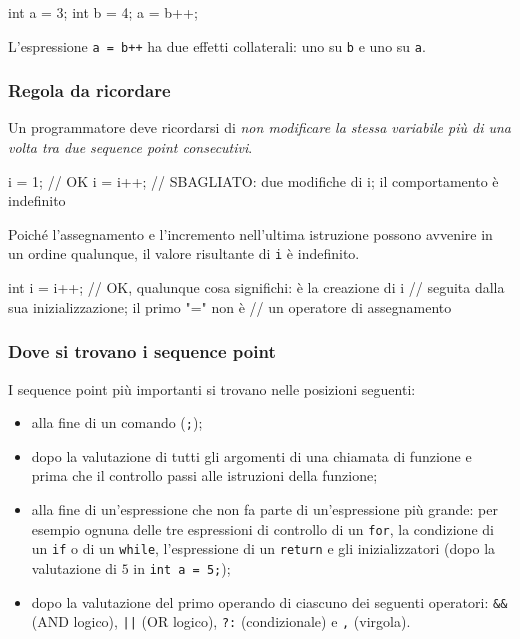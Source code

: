 \documentclass[11pt,a4paper]{article}
\begin{document}
\begin{esempio}
\begin{codice}
int a = 3;
int b = 4;
a = b++;
\end{codice}
L'espressione \lstinline|a = b++| ha due effetti collaterali: uno su \lstinline|b| e uno su \lstinline|a|.
\end{esempio}

\subsubsection{Regola da ricordare}

Un programmatore deve ricordarsi di \emph{non modificare la stessa variabile più di una volta tra due sequence point consecutivi}.

\begin{codice}
i = 1;       // OK
i = i++;     // SBAGLIATO: due modifiche di i; il comportamento è indefinito
\end{codice}
Poiché l'assegnamento e l'incremento nell'ultima istruzione possono avvenire in un ordine qualunque, il valore risultante di \lstinline|i| è indefinito.
\begin{codice}
int i = i++;   // OK, qualunque cosa significhi: è la creazione di i
               // seguita dalla sua inizializzazione; il primo "=" non è
               // un operatore di assegnamento
\end{codice}

\subsubsection{Dove si trovano i sequence point}

I sequence point più importanti si trovano nelle posizioni seguenti:
\begin{itemize}
    \item alla fine di un comando (\lstinline|;|);
    \item dopo la valutazione di tutti gli argomenti di una chiamata di funzione e prima che il controllo passi alle istruzioni della funzione;
    \item alla fine di un'espressione che non fa parte di un'espressione più grande: per esempio ognuna delle tre espressioni di controllo di un \lstinline|for|, la condizione di un \lstinline|if| o di un \lstinline|while|, l'espressione di un \lstinline|return| e gli inizializzatori (dopo la valutazione di $5$ in \lstinline|int a = 5;|);
    \item dopo la valutazione del primo operando di ciascuno dei seguenti operatori: \lstinline|&&| (AND logico), \lstinline/||/ (OR logico), \lstinline|?:| (condizionale) e \lstinline|,| (virgola).
\end{itemize}
\end{document}
